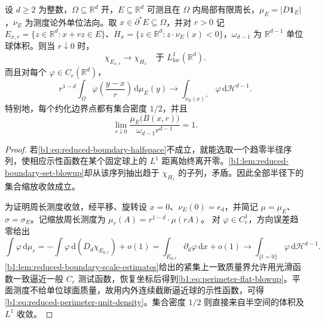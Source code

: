 \begin{theorem}[约化边界处的半空间缩放]\label{b1:thm:reduced-boundary-blowup}
设 \(d\ge2\) 为整数，\(\Omega\subseteq\mathbb R^d\) 开，\(E\subseteq\mathbb R^d\) 可测且在 \(\Omega\) 内局部有限周长，\(\mu_E=|D\mathbf1_E|\)，\(\nu_E\) 为测度论外单位法向。取 \(x\in\partial^*E\subseteq\Omega\)，并对 \(r>0\) 记 \(E_{x,r}=\{z\in\mathbb R^d:x+rz\in E\}\)、\(H_x=\{z\in\mathbb R^d:z\cdot\nu_E(x)<0\}\)，\(\omega_{d-1}\) 为 \(\mathbb R^{d-1}\) 单位球体积。则当 \(r\downarrow0\) 时，
\begin{equation}\label{b1:eq:reduced-boundary-halfspace}
 \chi_{E_{x,r}}\longrightarrow\chi_{H_x}
 \quad\text{于 }L^1_{\mathrm{loc}}(\mathbb R^d).
\end{equation}
而且对每个 \(\varphi\in C_c(\mathbb R^d)\)，
\begin{equation}\label{b1:eq:perimeter-flat-blowup}
 r^{1-d}\int_\Omega
 \varphi\left(\frac{y-x}{r}\right)\,\mathrm d\mu_E(y)
 \longrightarrow
 \int_{\nu_E(x)^\perp}\varphi\,\mathrm d\mathcal H^{d-1}.
\end{equation}
特别地，每个约化边界点都有集合密度 \(1/2\)，并且
\begin{equation}\label{b1:eq:reduced-perimeter-unit-density}
 \lim_{r\downarrow0}
 \frac{\mu_E\bigl(B(x,r)\bigr)}{\omega_{d-1}r^{d-1}}=1.
\end{equation}
\end{theorem}
\begin{proof}
若\eqref{b1:eq:reduced-boundary-halfspace}不成立，就能选取一个趋零半径序列，使相应示性函数在某个固定球上的 \(L^1\) 距离始终离开零。\cref{b1:lem:reduced-boundary-set-blowup}却从该序列抽出趋于 \(\chi_{H_x}\) 的子列，矛盾。因此全部半径下的集合缩放收敛成立。

为证明周长测度收敛，经平移、旋转设 \(x=0\)、\(\nu_E(0)=e_d\)，并简记 \(\mu=\mu_E\)、\(\sigma=\sigma_E\)。记缩放周长测度为
\(\mu_r(A)=r^{1-d}\cdot \mu(rA)\)。
对 \(\varphi\in C_c^1\)，方向误差趋零给出
\[
 \int\varphi\,\mathrm d\mu_r
 =-\int\varphi\,\mathrm d(D_d\chi_{E_{0,r}})+o(1)
 =\int_{E_{0,r}}\partial_d\varphi\,\mathrm dx+o(1)
 \longrightarrow\int_{\{t=0\}}\varphi\,\mathrm d\mathcal H^{d-1}.
\]
\cref{b1:lem:reduced-boundary-scale-estimates}给出的紧集上一致质量界允许用光滑函数一致逼近一般 \(C_c\) 测试函数，恢复坐标后得到\eqref{b1:eq:perimeter-flat-blowup}。平面测度不给单位球面质量，故用内外连续截断逼近球的示性函数，可得\eqref{b1:eq:reduced-perimeter-unit-density}。集合密度 \(1/2\) 则直接来自半空间的体积及 \(L^1\) 收敛。
\end{proof}

